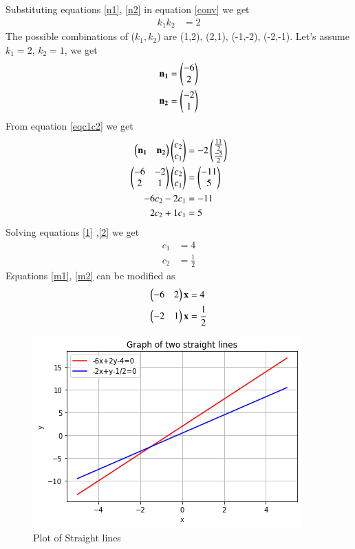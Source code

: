 \documentclass[journal,12pt,twocolumn]{IEEEtran}
\begin{document}
Substituting equations \eqref{n1}, \eqref{n2} in equation \eqref{conv} we get 
\begin{align}
    k_1k_2 &= 2
\end{align}
The possible combinations of ($k_1,k_2$) are (1,2), (2,1), (-1,-2), (-2,-1). 
Let's assume $k_1=2$, $k_2=1$, we get 
\begin{align}
    \mathbf{n_1}&=\begin{pmatrix}-6 \\ 2\end{pmatrix}\label{n11}\\
    \mathbf{n_2}&=\begin{pmatrix}-2 \\ 1\end{pmatrix}\label{n22}
\end{align}
From equation \eqref{eqc1c2} we get 
\begin{align}
    \begin{pmatrix}\mathbf{n_1} & \mathbf{n_2}\end{pmatrix}\begin{pmatrix}c_2\\c_1\end{pmatrix} & =-2\begin{pmatrix}\frac{11}{2}\\\frac{-5}{2}\end{pmatrix} \\
    \begin{pmatrix}-6 & -2 \\2 & 1\end{pmatrix}\begin{pmatrix}c_2\\c_1\end{pmatrix} &= \begin{pmatrix}-11 \\ 5\end{pmatrix} \\
    -6c_2 - 2c_1 &= -11 \label{1}\\
    2c_2 + 1c_1 &= 5 \label{2}
\end{align}
Solving equations \eqref{1} ,\eqref{2} we get 
\begin{align}
    c_1 &= 4\\
    c_2 &= \frac{1}{2}
\end{align}
Equations \eqref{m1}, \eqref{m2} can be modified as
\begin{align}
    \begin{pmatrix}-6 & 2\end{pmatrix}\mathbf{x} &= 4\\
    \begin{pmatrix}-2 & 1\end{pmatrix}\mathbf{x} &= \frac{1}{2}
\end{align}
\renewcommand{\thefigure}{\arabic{figure}}
\begin{figure}[h!]
	\centering
	\includegraphics[width=\columnwidth]{straightlines.png}
	\caption{Plot of Straight lines}
	\label{fig_1}
\end{figure}
\\
\end{document}
